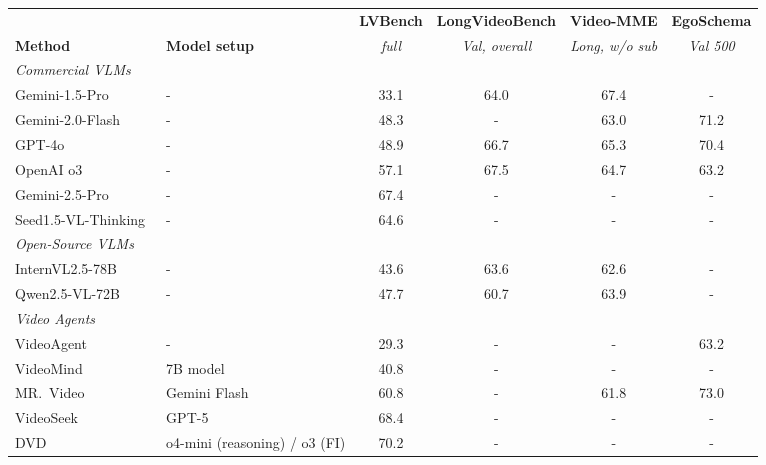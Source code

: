 \documentclass[letterpaper]{article} %
\begin{document}
\begin{table}[!tb]
  \centering
  \small
  \setlength{\tabcolsep}{2.5pt}
  \begin{tabular}{@{}llcccc@{}}
    \toprule
    & & \textbf{LVBench} & \textbf{LongVideoBench} & \textbf{Video-MME} & \textbf{EgoSchema} \\
    \textbf{Method} & \textbf{Model setup}
    & \textit{full}
    & \textit{Val, overall}
    & \textit{Long, w/o sub}
    & \textit{Val 500} \\
    \midrule
    \multicolumn{6}{l}{\textit{Commercial VLMs}} \\
    Gemini-1.5-Pro~\cite{gemini15}
      & -             & 33.1 & 64.0 & 67.4 & -   \\
    Gemini-2.0-Flash~\cite{gemini15}
      & -             & 48.3 & - & 63.0 & 71.2   \\
    GPT-4o~\cite{gpt4o}
      & -             & 48.9 & 66.7 & 65.3 & 70.4 \\
    OpenAI o3~\cite{o3}
      & -             & 57.1 & 67.5 & 64.7 & 63.2 \\
    Gemini-2.5-Pro~\cite{gemini25}
      & -             & 67.4 & -   & -   & -   \\
    Seed1.5-VL-Thinking~\cite{seed}
      & -             & 64.6 & - & -   & -   \\
    \midrule
    \multicolumn{6}{l}{\textit{Open-Source VLMs}} \\
    InternVL2.5-78B~\cite{internvl}
      & -             & 43.6 & 63.6 & 62.6  & -   \\
    Qwen2.5-VL-72B~\cite{qwen}
      & -             & 47.7 & 60.7 & 63.9 & -   \\
    \midrule
    \multicolumn{6}{l}{\textit{Video Agents}} \\
    VideoAgent~\cite{videoagent}
      & -            & 29.3 & -   & -   & 63.2 \\
    VideoMind~\cite{videomind}
      & 7B model      & 40.8 & -   & -   & -   \\
    MR.~Video~\cite{mrvideo}
      & Gemini Flash  & 60.8 & -   & 61.8 & 73.0 \\
    VideoSeek~\cite{videoseek}
      & GPT-5         & 68.4 & -   & -   & -   \\
    DVD~\cite{deepvideo2025}
      & o4-mini (reasoning) / o3 (FI)        & 70.2 & -   & -   & -   \\

\end{tabular}
\end{table}
\end{document}
